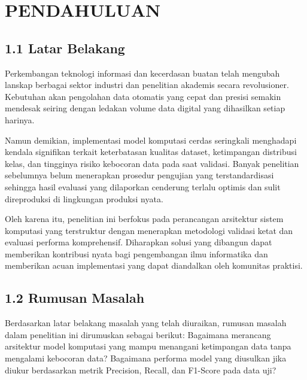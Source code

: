\documentclass[12pt,a4paper,oneside]{report}
\begin{document}
\tableofcontents
\newpage
\listoftables
\newpage
\listoffigures
\newpage

\cleardoublepage
{}
\pagestyle{maincontent}

\chapter{PENDAHULUAN}
\section{1.1 Latar Belakang}
Perkembangan teknologi informasi dan kecerdasan buatan telah mengubah lanskap berbagai sektor industri dan penelitian akademis secara revolusioner. Kebutuhan akan pengolahan data otomatis yang cepat dan presisi semakin mendesak seiring dengan ledakan volume data digital yang dihasilkan setiap harinya.

Namun demikian, implementasi model komputasi cerdas seringkali menghadapi kendala signifikan terkait keterbatasan kualitas dataset, ketimpangan distribusi kelas, dan tingginya risiko kebocoran data pada saat validasi. Banyak penelitian sebelumnya belum menerapkan prosedur pengujian yang terstandardisasi sehingga hasil evaluasi yang dilaporkan cenderung terlalu optimis dan sulit direproduksi di lingkungan produksi nyata.

Oleh karena itu, penelitian ini berfokus pada perancangan arsitektur sistem komputasi yang terstruktur dengan menerapkan metodologi validasi ketat dan evaluasi performa komprehensif. Diharapkan solusi yang dibangun dapat memberikan kontribusi nyata bagi pengembangan ilmu informatika dan memberikan acuan implementasi yang dapat diandalkan oleh komunitas praktisi.

\section{1.2 Rumusan Masalah}
Berdasarkan latar belakang masalah yang telah diuraikan, rumusan masalah dalam penelitian ini dirumuskan sebagai berikut:
Bagaimana merancang arsitektur model komputasi yang mampu menangani ketimpangan data tanpa mengalami kebocoran data?
Bagaimana performa model yang diusulkan jika diukur berdasarkan metrik Precision, Recall, dan F1-Score pada data uji?
\end{document}
